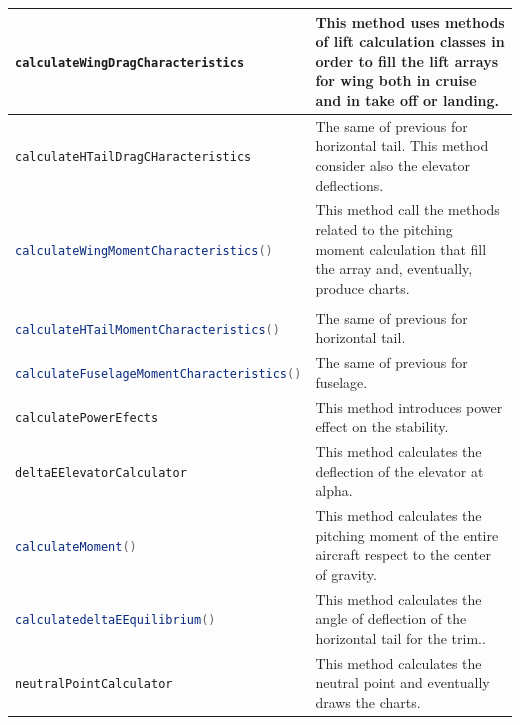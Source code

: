 \begin{longtable} {lp{}}
		\lstinline[language=Java]!calculateWingDragCharacteristics! & This method uses methods of lift calculation classes in order to fill the lift arrays for wing both in cruise and in take off or landing.\\\hline 
		\lstinline[language=Java]!calculateHTailDragCHaracteristics! & The same of previous for horizontal tail. This method consider also the elevator deflections.\\\hline 
		\lstinline[language=Java]!calculateWingMomentCharacteristics()!& This method call the methods related to the pitching moment calculation that fill the array and, eventually, produce charts.\\ \hline \\
		\lstinline[language=Java]!calculateHTailMomentCharacteristics()!& The same of previous for horizontal tail.\\ \hline 
		\lstinline[language=Java]!calculateFuselageMomentCharacteristics()!& The same of previous for fuselage.\\ \hline 
		\lstinline[language=Java]!calculatePowerEfects!& This method introduces power effect on the stability.\\ \hline
		\lstinline[language=Java]!deltaEElevatorCalculator!& This method calculates the deflection of the elevator at alpha.\\ \hline 
		\lstinline[language=Java]!calculateMoment()!& This method calculates the pitching moment of the entire aircraft respect to the center of gravity.\\ \hline 
		\lstinline[language=Java]!calculatedeltaEEquilibrium()!& This method calculates the angle of deflection of the horizontal tail for the trim..\\ \hline 
		\lstinline[language=Java]!neutralPointCalculator!& This method calculates the neutral point and eventually draws the charts.\\ \hline 
		\bottomrule
	\end{longtable}

